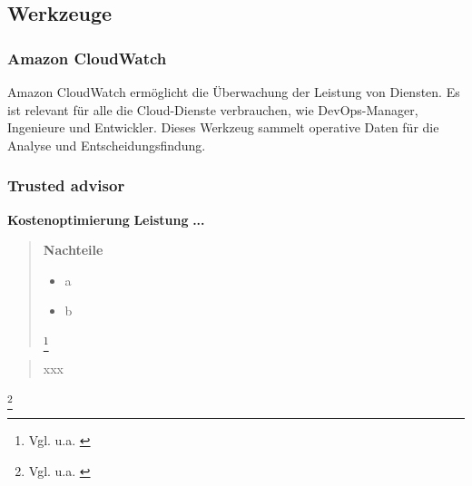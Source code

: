 \subsection{Werkzeuge}
\subsubsection{Amazon CloudWatch}
Amazon CloudWatch ermöglicht die Überwachung der Leistung von Diensten. Es ist relevant für alle die Cloud-Dienste verbrauchen, wie DevOps-Manager, Ingenieure und Entwickler. Dieses Werkzeug sammelt operative Daten für die Analyse und Entscheidungsfindung.


\subsubsection{Trusted advisor}

\textbf{Kostenoptimierung}
\textbf{Leistung}
\textbf{...}

\begin{quote}
  \textbf{Nachteile}
  \begin{itemize}
    \item
          a
    \item
          b

  \end{itemize}

  \footnote{Vgl. u.a. \cite{RH1}}
\end{quote}
\begin{quote}
  xxx
\end{quote}\footnote{Vgl. u.a. \cite{AX1}}

